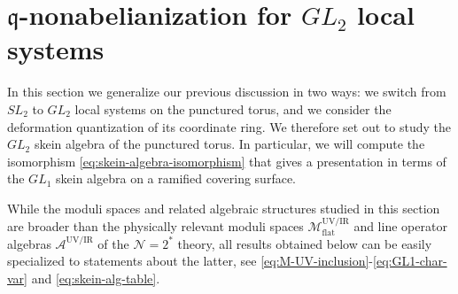 \documentclass{article}
\numberwithin{equation}{section}
\newcommand{\mq}{\mathfrak{q}}
\renewcommand{\flat}{\mathrm{flat}}
\def\CA{\mathcal{A}}
\def\CM{{\mathcal{M}}}
\def\CN{{\mathcal{N}}}
\begin{document}
\begin{enumerate}[label=(\arabic*)]
\end{enumerate}








\section{$\mq$-nonabelianization for ${GL}_2$ local systems }\label{sec:UV-IR-quant}


In this section we generalize our previous discussion in two ways: we switch from $SL_2$ to $GL_2$ local systems on the punctured torus, and we consider the deformation quantization of its coordinate ring. 
We therefore set out to study the $GL_2$ skein algebra of the punctured torus. In particular, we will compute the isomorphism \eqref{eq:skein-algebra-isomorphism} that gives a presentation in terms of the $GL_1$ skein algebra on a ramified covering surface.

While the moduli spaces and related algebraic structures studied in this section are broader than the physically relevant moduli spaces $\CM_{\flat}^{\text{UV/IR}}$ and line operator algebras $\CA^{\text{UV/IR}}$ of the $\CN=2^*$ theory, 
all results obtained below can be easily specialized to statements about the latter, see \eqref{eq:M-UV-inclusion}-\eqref{eq:GL1-char-var} and \eqref{eq:skein-alg-table}.

\end{document}
